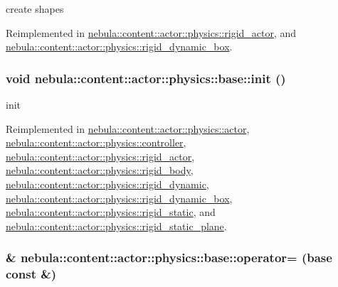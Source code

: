 create shapes 

Reimplemented in \hyperlink{classnebula_1_1content_1_1actor_1_1physics_1_1rigid__actor_a5ada308047050540ae655a7fe7ff8a3e}{nebula::content::actor::physics::rigid\_\-actor}, and \hyperlink{classnebula_1_1content_1_1actor_1_1physics_1_1rigid__dynamic__box_a77dc2beadcdfda10eeb5ef1abed6ee5e}{nebula::content::actor::physics::rigid\_\-dynamic\_\-box}.\hypertarget{classnebula_1_1content_1_1actor_1_1physics_1_1base_a606d649258515421027e98aef1f91f7f}{
\subsubsection[{init}]{\setlength{\rightskip}{0pt plus 5cm}void nebula::content::actor::physics::base::init ()}}
\label{classnebula_1_1content_1_1actor_1_1physics_1_1base_a606d649258515421027e98aef1f91f7f}


init 

Reimplemented in \hyperlink{classnebula_1_1content_1_1actor_1_1physics_1_1actor_a7ab3552a370009bff858cbff7245bc9c}{nebula::content::actor::physics::actor}, \hyperlink{classnebula_1_1content_1_1actor_1_1physics_1_1controller_adcc26e24dd15484de04d73b0043cda75}{nebula::content::actor::physics::controller}, \hyperlink{classnebula_1_1content_1_1actor_1_1physics_1_1rigid__actor_a9c4d9fe73271ad35a646c95fc12b4cde}{nebula::content::actor::physics::rigid\_\-actor}, \hyperlink{classnebula_1_1content_1_1actor_1_1physics_1_1rigid__body_a858ee11f899acf3cc8f94eccf5713384}{nebula::content::actor::physics::rigid\_\-body}, \hyperlink{classnebula_1_1content_1_1actor_1_1physics_1_1rigid__dynamic_ae9450372c5f60103573ed626ffda9532}{nebula::content::actor::physics::rigid\_\-dynamic}, \hyperlink{classnebula_1_1content_1_1actor_1_1physics_1_1rigid__dynamic__box_a235e20a7e695a39c7ccb0100b90c10ee}{nebula::content::actor::physics::rigid\_\-dynamic\_\-box}, \hyperlink{classnebula_1_1content_1_1actor_1_1physics_1_1rigid__static_a37aa702d9a31ff9529659343c6155482}{nebula::content::actor::physics::rigid\_\-static}, and \hyperlink{classnebula_1_1content_1_1actor_1_1physics_1_1rigid__static__plane_ae7e418de928a5830a9e088bb843c95f0}{nebula::content::actor::physics::rigid\_\-static\_\-plane}.\hypertarget{classnebula_1_1content_1_1actor_1_1physics_1_1base_a8b950d8d7230bd6899cb3da7b6116f02}{
\subsubsection[{operator=}]{\& nebula::content::actor::physics::base::operator= ({\bf base} const \&)}}
\label{classnebula_1_1content_1_1actor_1_1physics_1_1base_a8b950d8d7230bd6899cb3da7b6116f02}


